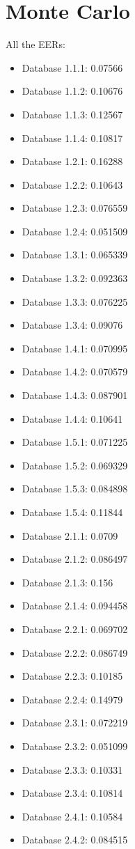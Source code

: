 \chapter{Monte Carlo}
All the EERs:\begin{itemize}
\item Database 1.1.1: 0.07566
\item Database 1.1.2: 0.10676
\item Database 1.1.3: 0.12567
\item Database 1.1.4: 0.10817
\item Database 1.2.1: 0.16288
\item Database 1.2.2: 0.10643
\item Database 1.2.3: 0.076559
\item Database 1.2.4: 0.051509
\item Database 1.3.1: 0.065339
\item Database 1.3.2: 0.092363
\item Database 1.3.3: 0.076225
\item Database 1.3.4: 0.09076
\item Database 1.4.1: 0.070995
\item Database 1.4.2: 0.070579
\item Database 1.4.3: 0.087901
\item Database 1.4.4: 0.10641
\item Database 1.5.1: 0.071225
\item Database 1.5.2: 0.069329
\item Database 1.5.3: 0.084898
\item Database 1.5.4: 0.11844
\item Database 2.1.1: 0.0709
\item Database 2.1.2: 0.086497
\item Database 2.1.3: 0.156
\item Database 2.1.4: 0.094458
\item Database 2.2.1: 0.069702
\item Database 2.2.2: 0.086749
\item Database 2.2.3: 0.10185
\item Database 2.2.4: 0.14979
\item Database 2.3.1: 0.072219
\item Database 2.3.2: 0.051099
\item Database 2.3.3: 0.10331
\item Database 2.3.4: 0.10814
\item Database 2.4.1: 0.10584
\item Database 2.4.2: 0.084515

\end{itemize}
